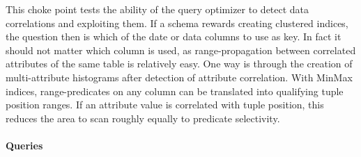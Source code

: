 
This choke point tests the ability of the query optimizer to detect data
correlations and exploiting them. If a schema rewards creating clustered
indices, the question then is which of the date or data columns to use as key.
In fact it should not matter which column is used, as range-propagation between
correlated attributes of the same table is relatively easy. One way is through
the creation of multi-attribute histograms after detection of attribute
correlation. With MinMax indices, range-predicates on any column can be
translated into qualifying tuple position ranges. If an attribute value is
correlated with tuple position, this reduces the area to scan roughly equally to
predicate selectivity.


\paragraph{Queries}
{\raggedright
}